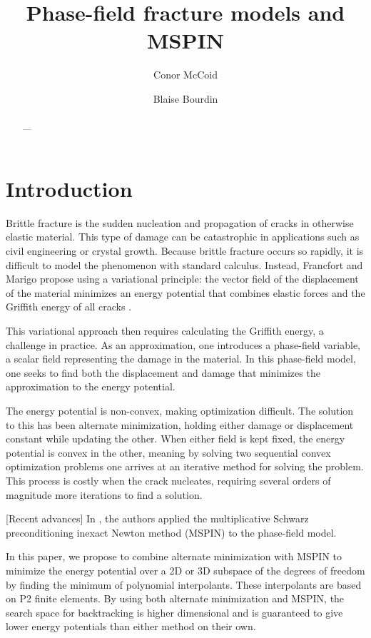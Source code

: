\documentclass{article}
\title{Phase-field fracture models and MSPIN} %
\author{Conor McCoid \and Blaise Bourdin}
\numberwithin{equation}{section}
\begin{document}
\maketitle

\begin{abstract}
---
\end{abstract}
\tableofcontents

\section{Introduction}
\label{sec: intro}

Brittle fracture is the sudden nucleation and propagation of cracks in otherwise elastic material.
This type of damage can be catastrophic in applications such as civil engineering or crystal growth.
Because brittle fracture occurs so rapidly, it is difficult to model the phenomenon with standard calculus.
Instead, Francfort and Marigo \autocite{Francfort-Marigo-1998,bourdin2008variational} propose using a variational principle: the vector field of the displacement of the material minimizes an energy potential that combines elastic forces and the Griffith energy of all cracks \cite{griffith1921vi}.

This variational approach then requires calculating the Griffith energy, a challenge in practice.
As an approximation, one introduces a phase-field variable, a scalar field representing the damage in the material.
In this phase-field model, one seeks to find both the displacement and damage that minimizes the approximation to the energy potential.

The energy potential is non-convex, making optimization difficult.
The solution to this has been alternate minimization, holding either damage or displacement constant while updating the other.
When either field is kept fixed, the energy potential is convex in the other, meaning by solving two sequential convex optimization problems one arrives at an iterative method for solving the problem.
This process is costly when the crack nucleates, requiring several orders of magnitude more iterations to find a solution.

[Recent advances]
In \cite{3k}, the authors applied the multiplicative Schwarz preconditioning inexact Newton method (MSPIN) to the phase-field model.

In this paper, we propose to combine alternate minimization with MSPIN to minimize the energy potential over a 2D or 3D subspace of the degrees of freedom by finding the minimum of polynomial interpolants.
These interpolants are based on P2 finite elements.
By using both alternate minimization and MSPIN, the search space for backtracking is higher dimensional and is guaranteed to give lower energy potentials than either method on their own.
\end{document}
